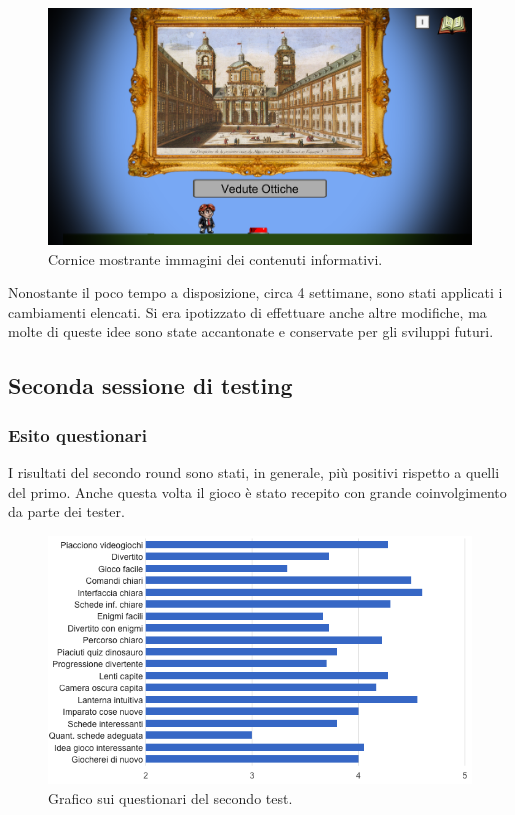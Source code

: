 \begin{itemize}
\end{itemize}

\begin{figure}[h]
\centerline{\includegraphics[scale=0.35]{images/risultati/cornice_serious.png}}
\caption{Cornice mostrante immagini dei contenuti informativi.}
\label{fig:cornice_serious}
\end{figure}

Nonostante il poco tempo a disposizione, circa 4 settimane, sono stati applicati i cambiamenti elencati. Si era ipotizzato di effettuare anche altre modifiche, ma molte di queste idee sono state accantonate e conservate per gli sviluppi futuri.


\subsection{Seconda sessione di testing}
\label{sec:testing_secondo_test}


\subsubsection{Esito questionari}

I risultati del secondo round sono stati, in generale, più positivi rispetto a quelli del primo. Anche questa volta il gioco è stato recepito con grande coinvolgimento da parte dei tester.

\begin{figure}[h]
\centerline{\includegraphics[scale=0.55]{images/risultati/test_02_questionario.png}}
\caption{Grafico sui questionari del secondo test.}
\label{fig:test-questionario02}
\end{figure}


